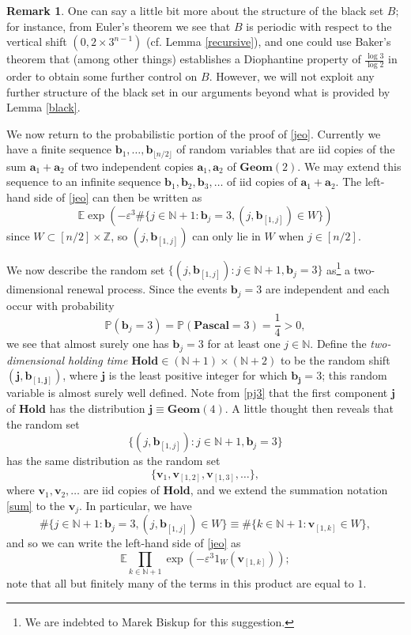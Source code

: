 \documentclass[12pt,a4paper,reqno]{amsart}
\numberwithin{equation}{section}
\theoremstyle{plain}
\theoremstyle{definition}
\newtheorem{remark}[theorem]{Remark}
\renewcommand\P{\mathbb{P}}
\newcommand\E{\mathbb{E}}
\newcommand\Z{\mathbb{Z}}
\newcommand\N{\mathbb{N}}
\renewcommand\a{\mathbf{a}}
\renewcommand\b{\mathbf{b}}
\renewcommand\j{\mathbf{j}}
\renewcommand\v{\mathbf{v}}
\newcommand\Geom{\mathbf{Geom}}
\newcommand\Pascal{\mathbf{Pascal}}
\newcommand\Hold{\mathbf{Hold}}
\newcommand\eps{\varepsilon}
\begin{document}
\begin{remark} One can say a little bit more about the structure of the black set $B$; for instance, from Euler's theorem we see that $B$ is periodic with respect to the vertical shift $(0, 2 \times 3^{n-1})$ (cf. Lemma \ref{recursive}), and one could use Baker's theorem \cite{baker} that (among other things) establishes a Diophantine property of $\frac{\log 3}{\log 2}$ in order to obtain some further control on $B$.  However, we will not exploit any further structure of the black set in our arguments beyond what is provided by Lemma \ref{black}.
\end{remark}

We now return to the probabilistic portion of the proof of \eqref{jeo}.  Currently we have a finite sequence $\b_1,\dots,\b_{\lfloor n/2\rfloor}$ of random variables that are iid copies of the sum $\a_1+\a_2$ of two independent copies $\a_1,\a_2$ of $\Geom(2)$.  We may extend this sequence to an infinite sequence $\b_1,\b_2,\b_3,\dots$ of iid copies of $\a_1+\a_2$.  The left-hand side of \eqref{jeo} can then be written as
$$
\E \exp( - \eps^3 \# \{ j \in \N+1: \b_j = 3, (j,\b_{[1,j]}) \in W \} ) $$
since $W \subset [n/2] \times \Z$, so $(j,\b_{[1,j]})$ can only lie in $W$ when $j \in [n/2]$.

We now describe the random set $\{ (j,\b_{[1,j]}): j \in \N+1, \b_j = 3\}$ as\footnote{We are indebted to Marek Biskup for this suggestion.} a two-dimensional renewal process.  Since the events $\b_j=3$ are independent and each occur with probability
\begin{equation}\label{pj3}
 \P( \b_j = 3 ) = \P( \Pascal = 3 ) = \frac{1}{4} > 0,
\end{equation}
we see that almost surely one has $\b_j=3$ for at least one $j \in \N$.  Define the \emph{two-dimensional holding time} $\Hold \in (\N+1) \times (\N+2)$ to be the random shift $(\j,\b_{[1,\j]})$, where $\j$ is the least positive integer for which $\b_\j =3$; this random variable is almost surely well defined.  Note from \eqref{pj3} that the first component $\j$ of $\Hold$ has the distribution $\j \equiv \Geom(4)$.
A little thought then reveals that the random set
\begin{equation}\label{bas}
 \{ (j,\b_{[1,j]}): j \in \N+1, \b_j = 3\} 
\end{equation}
has the same distribution as the random set
\begin{equation}\label{vas}
 \{ \v_1, \v_{[1,2]}, \v_{[1,3]}, \dots \},
\end{equation}
where $\v_1, \v_2, \dots$ are iid copies of $\Hold$, and we extend the summation notation \eqref{sum} to the $\v_j$.  In particular, we have
$$
 \# \{ j \in \N+1: \b_j = 3, (j,\b_{[1,j]}) \in W \} \equiv \# \{ k \in \N+1: \v_{[1,k]} \in W \},$$
and so we can write the left-hand side of \eqref{jeo} as
$$ \E \prod_{k \in \N+1} \exp( - \eps^3 1_W(\v_{[1,k]}) );$$
note that all but finitely many of the terms in this product are equal to $1$. 
\end{document}
